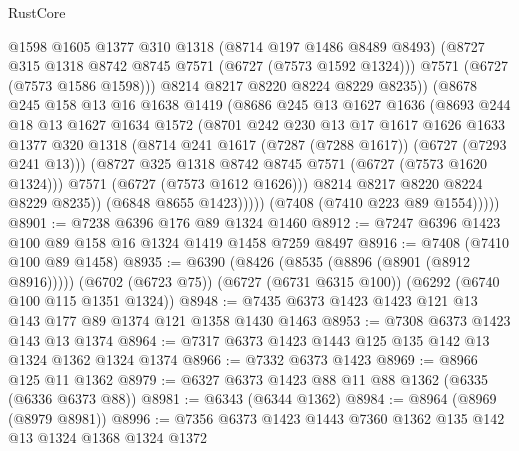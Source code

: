 \begin{lexlean}{RustCore}
\begin{coremodule}
                      @1598
                      @1605
                      @1377
                      @310
                      @1318
                      (@8714 @197 @1486 @8489 @8493)
                      (@8727 @315 @1318 @8742 @8745 @7571 (@6727 (@7573 @1592 @1324)))
                      @7571
                      (@6727 (@7573 @1586 @1598)))
                    @8214
                    @8217
                    @8220
                    @8224
                    @8229
                    @8235))
                (@8678
                  @245
                  @158
                  @13
                  @16
                  @1638
                  @1419
                  (@8686
                    @245
                    @13
                    @1627
                    @1636
                    (@8693
                      @244
                      @18
                      @13
                      @1627
                      @1634
                      @1572
                      (@8701
                        @242
                        @230
                        @13
                        @17
                        @1617
                        @1626
                        @1633
                        @1377
                        @320
                        @1318
                        (@8714 @241 @1617 (@7287 (@7288 @1617)) (@6727 (@7293 @241 @13)))
                        (@8727 @325 @1318 @8742 @8745 @7571 (@6727 (@7573 @1620 @1324)))
                        @7571
                        (@6727 (@7573 @1612 @1626)))
                      @8214
                      @8217
                      @8220
                      @8224
                      @8229
                      @8235))
                  (@6848 @8655 @1423)))))
          (@7408 (@7410 @223 @89 @1554)))))
@8901 := @7238 @6396 @176 @89 @1324 @1460
@8912 := @7247 @6396 @1423 @100 @89 @158 @16 @1324 @1419 @1458 @7259 @8497
@8916 := @7408 (@7410 @100 @89 @1458)
@8935 := @6390
    (@8426 (@8535 (@8896 (@8901 (@8912 @8916)))))
    (@6702 (@6723 @75))
    (@6727 (@6731 @6315 @100))
    (@6292 (@6740 @100 @115 @1351 @1324))
@8948 := @7435 @6373 @1423 @1423 @121 @13 @143 @177 @89 @1374 @121 @1358 @1430 @1463
@8953 := @7308 @6373 @1423 @143 @13 @1374
@8964 := @7317 @6373 @1423 @1443 @125 @135 @142 @13 @1324 @1362 @1324 @1374
@8966 := @7332 @6373 @1423
@8969 := @8966 @125 @11 @1362
@8979 := @6327 @6373 @1423 @88 @11 @88 @1362 (@6335 (@6336 @6373 @88))
@8981 := @6343 (@6344 @1362)
@8984 := @8964 (@8969 (@8979 @8981))
@8996 := @7356 @6373 @1423 @1443 @7360 @1362 @135 @142 @13 @1324 @1368 @1324 @1372

\end{coremodule}
\end{lexlean}
